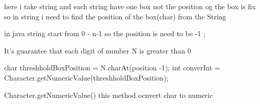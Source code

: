 here i take string and each string have one box 
not the position og the box is fix
so in string i need to find the position of the box(char) from the String

in java string start from 0 - n-1 
so the position is need to be -1 ;

It's guarantee that each digit of number N
 is greater than 0

char threshholdBoxPosition = N.charAt(position -1);
            int converInt = Character.getNumericValue(threshholdBoxPosition);

            Character.getNumericValue() this method ocnvert char to numeric

